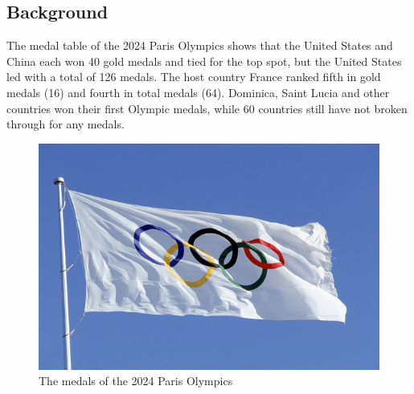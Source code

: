 \documentclass{mcmthesis}
\begin{document}
	\subsection{Background}
	The medal table of the 2024 Paris Olympics shows that the United States and China each won 40 gold medals and tied for the top spot, but the United States led with a total of 126 medals. The host country France ranked fifth in gold medals (16) and fourth in total medals (64). Dominica, Saint Lucia and other countries won their first Olympic medals, while 60 countries still have not broken through for any medals.
	\begin{figure}[htbp]
		\centering
		\includegraphics[width=0.7\linewidth]{fig/background1}
		\caption{The medals of the 2024 Paris Olympics}
	\end{figure}
	
\end{document}
